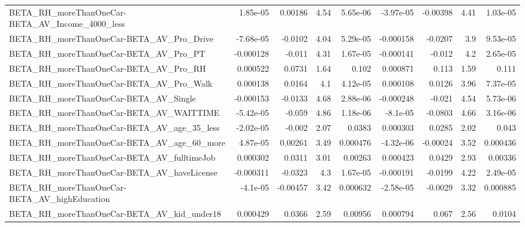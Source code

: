 \begin{tabular}{lrrrrrrrr}
BETA\_RH\_moreThanOneCar-BETA\_AV\_Income\_4000\_less    &    1.85e-05 &      0.00186 &      4.54 & 5.65e-06 &  -3.97e-05 &    -0.00398 &         4.41 &      1.03e-05 \\
BETA\_RH\_moreThanOneCar-BETA\_AV\_Pro\_Drive           &   -7.68e-05 &      -0.0102 &      4.04 & 5.29e-05 &  -0.000158 &     -0.0207 &          3.9 &      9.53e-05 \\
BETA\_RH\_moreThanOneCar-BETA\_AV\_Pro\_PT              &   -0.000128 &       -0.011 &      4.31 & 1.67e-05 &  -0.000141 &      -0.012 &          4.2 &      2.65e-05 \\
BETA\_RH\_moreThanOneCar-BETA\_AV\_Pro\_RH              &    0.000522 &       0.0731 &      1.64 &    0.102 &   0.000871 &       0.113 &         1.59 &         0.111 \\
BETA\_RH\_moreThanOneCar-BETA\_AV\_Pro\_Walk            &    0.000138 &       0.0164 &       4.1 & 4.12e-05 &   0.000108 &      0.0126 &         3.96 &      7.37e-05 \\
BETA\_RH\_moreThanOneCar-BETA\_AV\_Single              &   -0.000153 &      -0.0133 &      4.68 & 2.88e-06 &  -0.000248 &      -0.021 &         4.54 &      5.73e-06 \\
BETA\_RH\_moreThanOneCar-BETA\_AV\_WAITTIME            &   -5.42e-05 &       -0.059 &      4.86 & 1.18e-06 &   -8.1e-05 &     -0.0803 &         4.66 &      3.16e-06 \\
BETA\_RH\_moreThanOneCar-BETA\_AV\_age\_35\_less         &   -2.02e-05 &       -0.002 &      2.07 &   0.0383 &   0.000303 &      0.0285 &         2.02 &         0.043 \\
BETA\_RH\_moreThanOneCar-BETA\_AV\_age\_60\_more         &    4.87e-05 &      0.00261 &      3.49 & 0.000476 &  -4.32e-06 &    -0.00024 &         3.52 &      0.000436 \\
BETA\_RH\_moreThanOneCar-BETA\_AV\_fulltimeJob         &    0.000302 &       0.0311 &      3.01 &  0.00263 &   0.000423 &      0.0429 &         2.93 &       0.00336 \\
BETA\_RH\_moreThanOneCar-BETA\_AV\_haveLicense         &   -0.000311 &      -0.0323 &       4.3 & 1.67e-05 &  -0.000191 &     -0.0199 &         4.22 &      2.49e-05 \\
BETA\_RH\_moreThanOneCar-BETA\_AV\_highEducation       &    -4.1e-05 &     -0.00457 &      3.42 & 0.000632 &  -2.58e-05 &     -0.0029 &         3.32 &      0.000885 \\
BETA\_RH\_moreThanOneCar-BETA\_AV\_kid\_under18         &    0.000429 &       0.0366 &      2.59 &  0.00956 &   0.000794 &       0.067 &         2.56 &        0.0104 \\

\end{tabular}
